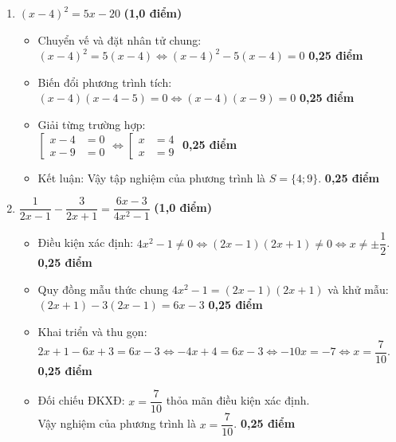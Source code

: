 \documentclass[12pt,a4paper]{article}
\begin{document}
\begin{enumerate}[label=\arabic*), leftmargin=18pt, itemsep=3pt, parsep=0pt]
  \item $(x - 4)^2 = 5x - 20$ \hfill \textbf{(1,0 điểm)}
  \begin{itemize}[leftmargin=16pt, itemsep=1.5pt, parsep=0pt]
    \item Chuyển vế và đặt nhân tử chung:\\
    $(x - 4)^2 = 5(x - 4) \iff (x - 4)^2 - 5(x - 4) = 0$ \dotfill \textbf{0,25 điểm}
    \item Biến đổi phương trình tích:\\
    $(x - 4)(x - 4 - 5) = 0 \iff (x - 4)(x - 9) = 0$ \dotfill \textbf{0,25 điểm}
    \item Giải từng trường hợp:\\
    $\left[\begin{aligned} x - 4 &= 0 \\ x - 9 &= 0 \end{aligned}\right. \iff \left[\begin{aligned} x &= 4 \\ x &= 9 \end{aligned}\right.$ \dotfill \textbf{0,25 điểm}
    \item Kết luận: Vậy tập nghiệm của phương trình là $S = \{4; 9\}$. \dotfill \textbf{0,25 điểm}
  \end{itemize}

  \item $\dfrac{1}{2x - 1} - \dfrac{3}{2x + 1} = \dfrac{6x - 3}{4x^2 - 1}$ \hfill \textbf{(1,0 điểm)}
  \begin{itemize}[leftmargin=16pt, itemsep=1.5pt, parsep=0pt]
    \item Điều kiện xác định: $4x^2 - 1 \neq 0 \iff (2x - 1)(2x + 1) \neq 0 \iff x \neq \pm \dfrac{1}{2}$. \dotfill \textbf{0,25 điểm}
    \item Quy đồng mẫu thức chung $4x^2 - 1 = (2x - 1)(2x + 1)$ và khử mẫu:\\
    $(2x + 1) - 3(2x - 1) = 6x - 3$ \dotfill \textbf{0,25 điểm}
    \item Khai triển và thu gọn:\\
    $2x + 1 - 6x + 3 = 6x - 3 \iff -4x + 4 = 6x - 3 \iff -10x = -7 \iff x = \dfrac{7}{10}$. \dotfill \textbf{0,25 điểm}
    \item Đối chiếu ĐKXĐ: $x = \dfrac{7}{10}$ thỏa mãn điều kiện xác định.\\
    Vậy nghiệm của phương trình là $x = \dfrac{7}{10}$. \dotfill \textbf{0,25 điểm}
  \end{itemize}
\end{enumerate}
\end{document}
